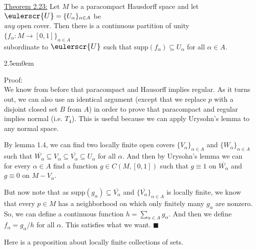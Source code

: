 \documentclass{book}
\newcommand{\mathcalli}[1]{\text{\scalebox{1.11}{$\eulerscr{#1}$}}}
\newcommand{\pracOne}{
   \color{BrickRed}%
   \fontsize{13}{15}\selectfont%
}
\newcommand{\exThreeP}{%
   \color{RedViolet}%
   \fontsize{12}{14}\selectfont%
}
\newenvironment{myIndent}{%
   \begin{adjustwidth}{2.5em}{0em}%
}{%
   \end{adjustwidth}%
}
\newcommand{\supp}{\mathrm{supp}}
\newcommand{\retTwo}{\hfill\bigbreak}
\begin{document}
\ul{Theorem 2.23:} Let $M$ be a paracompact Hausdorff space and let $\mathcalli{U} = \{U_\alpha\}_{\alpha \in A}$ be\\ \textit{any} open cover. Then there is a continuous partition of unity $\{f_\alpha: M \to [0, 1]\}_{\alpha \in A}$\\ subordinate to $\mathcalli{U}$ such that $\supp(f_\alpha) \subseteq U_\alpha$ for all $\alpha \in A$.
\begin{myIndent}\exThreeP
	Proof:\\
	We know from before that paracompact and Hausorff implies regular. As it turns out, we can also use an identical argument (except that we replace $p$ with a disjoint closed set $B$ from $A$) in order to prove that paracompact and regular implies normal (i.e. $T_4$). This is useful because we can apply Urysohn's lemma to any normal space.\retTwo

	By lemma 1.4, we can find two locally finite open covers $\{V_\alpha\}_{\alpha \in A}$ and $\{W_\alpha\}_{\alpha \in A}$ such that $\overline{W_\alpha} \subseteq V_\alpha \subseteq \overline{V_\alpha} \subseteq U_\alpha$ for all $\alpha$. And then by Urysohn's lemma we can for every $\alpha \in A$ find a function $g \in C(M, [0, 1])$ such that $g \equiv 1$ on $\overline{W_\alpha}$ and $g \equiv 0$ on $M - V_\alpha$.\retTwo

	But now note that as $\supp(g_\alpha) \subseteq \overline{V_\alpha}$ and $\{\overline{V_\alpha}\}_{\alpha \in A}$ is locally finite, we know that every $p \in M$ has a neighborhood on which only finitely many $g_\alpha$ are nonzero. So, we can define a continuous function $h = \sum_{\alpha \in A} g_\alpha$. And then we define $f_\alpha = g_\alpha / h$ for all $\alpha$. This satisfies what we want. $\blacksquare$\newpage
\end{myIndent}

\pracOne Here is a proposition about locally finite collections of sets.\retTwo
\end{document}

